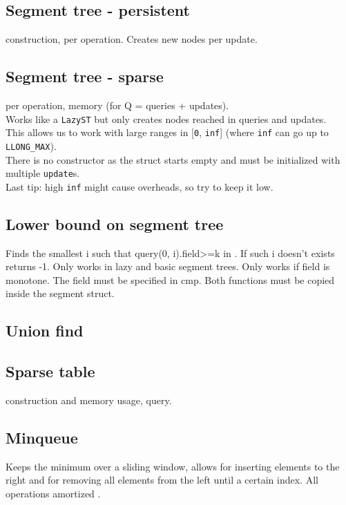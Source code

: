 \subsection{Segment tree - persistent}
 construction,  per operation.
Creates  new nodes per update.


\subsection{Segment tree - sparse}
 per operation,  memory (for Q = queries + updates).\\
Works like a \verb|LazyST| but only creates nodes reached in queries and updates.\\
This allows us to work with large ranges in [\verb|0|, \verb|inf|] (where \verb|inf| can go up to \verb|LLONG_MAX|).\\
There is no constructor as the struct starts empty and must be initialized with multiple \verb|update|s.\\
Last tip: high \verb|inf| might cause overheads, so try to keep it low.


\subsection{Lower bound on segment tree}
Finds the smallest i such that query(0, i).field>=k in .
If such i doesn't exists returns -1.
Only works in lazy and basic segment trees.
Only works if field is monotone. The field must be specified in cmp.
Both functions must be copied inside the segment struct.



\subsection{Union find}


\subsection{Sparse table}
 construction and memory usage,  query.


\subsection{Minqueue}
Keeps the minimum over a sliding window, allows for inserting elements to the right and for removing all elements from the left until a certain index. All operations amortized .


